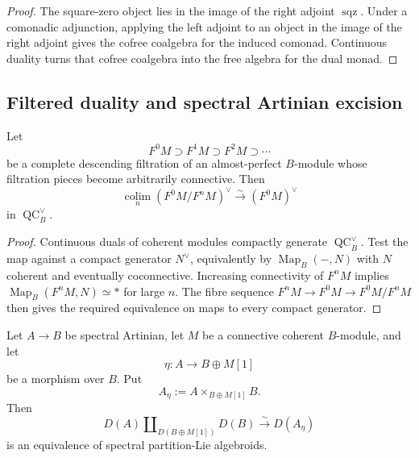 \begin{proof}
The square-zero object lies in the image of the right adjoint
$\operatorname{sqz}$.  Under a comonadic adjunction, applying the left
adjoint to an object in the image of the right adjoint gives the cofree
coalgebra for the induced comonad.  Continuous duality turns that cofree
coalgebra into the free algebra for the dual monad.
\end{proof}

\subsection{Filtered duality and spectral Artinian excision}

\begin{lemma}
\label{lem:bnla-dual-complete-filtration}
Let
\[
    F^0M\supset F^1M\supset F^2M\supset\cdots
\]
be a complete descending filtration of an almost-perfect $B$-module whose
filtration pieces become arbitrarily connective.  Then
\[
\boxed{
    \operatorname*{colim}_n
    \left(F^0M/F^nM\right)^\vee
    \xrightarrow{\sim}
    \left(F^0M\right)^\vee}
\]
in $\operatorname{QC}^{\vee}_B$.
\end{lemma}

\begin{proof}
Continuous duals of coherent modules compactly generate
$\operatorname{QC}^{\vee}_B$.  Test the map against a compact generator
$N^\vee$, equivalently by $\operatorname{Map}_B(-,N)$ with $N$ coherent and
eventually coconnective.  Increasing connectivity of $F^nM$ implies
$\operatorname{Map}_B(F^nM,N)\simeq*$ for large $n$.  The fibre sequence
$F^nM\to F^0M\to F^0M/F^nM$ then gives the required equivalence on maps to
every compact generator.
\end{proof}

\begin{theorem}
\label{thm:bnla-spectral-D-excision}
Let $A\to B$ be spectral Artinian, let $M$ be a connective coherent
$B$-module, and let
\[
    \eta:A\longrightarrow B\oplus M[1]
\]
be a morphism over $B$.  Put
\[
    A_\eta:=A\times_{B\oplus M[1]}B.
\]
Then
\[
\boxed{
    D(A)
    \amalg_{D(B\oplus M[1])}
    D(B)
    \xrightarrow{\sim}
    D(A_\eta)}
\]
is an equivalence of spectral partition-Lie algebroids.
\end{theorem}

